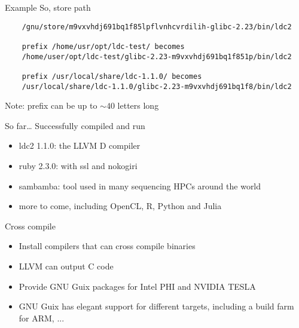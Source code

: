 \begin{frame}[fragile]{Example}
  So, store path
  \small
\begin{verbatim}
    /gnu/store/m9vxvhdj691bq1f85lpflvnhcvrdilih-glibc-2.23/bin/ldc2

    prefix /home/usr/opt/ldc-test/ becomes
    /home/user/opt/ldc-test/glibc-2.23-m9vxvhdj691bq1f851p/bin/ldc2

    prefix /usr/local/share/ldc-1.1.0/ becomes
    /usr/local/share/ldc-1.1.0/glibc-2.23-m9vxvhdj691bq1f8/bin/ldc2
\end{verbatim}
Note: prefix can be up to $\sim 40$ letters long
\end{frame}

\begin{frame}{So far\ldots}
  Successfully compiled and run
\begin{itemize}
\item ldc2 1.1.0: the LLVM D compiler
\item ruby 2.3.0: with ssl and nokogiri
\item sambamba: tool used in many sequencing HPCs around the world
\item more to come, including OpenCL, R, Python and Julia
\end{itemize}
\end{frame}

\begin{frame}{Cross compile}
\begin{itemize}
\item Install compilers that can cross compile binaries
\item LLVM can output C code
\item Provide GNU Guix packages for Intel PHI and NVIDIA TESLA
\item GNU Guix has elegant support for different targets, including a build farm for ARM, ...
\end{itemize}
\end{frame}
